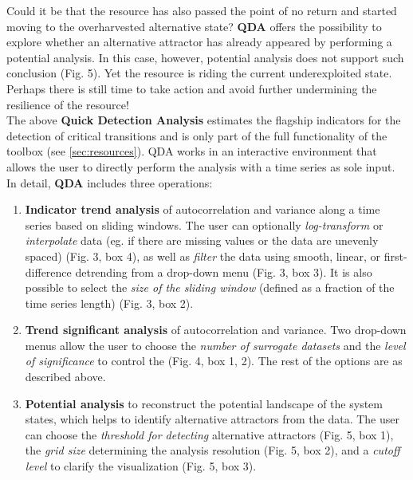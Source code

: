 \documentclass[12pt,a4paper,final]{article}
\begin{document}
\begin{doublespacing}
Could it be that the resource has also passed the point of no return and started moving to the overharvested alternative state? \textbf{QDA} offers the possibility to explore whether an alternative attractor has already appeared by performing a potential analysis. In this case, however, potential analysis does not support such conclusion (Fig. 5). Yet the resource is riding the current underexploited state. Perhaps there is still time to take action and avoid further undermining the resilience of the resource!\\


The above \textbf{Quick Detection Analysis} estimates the flagship indicators for the detection of critical transitions and is only part of the full functionality of the toolbox (see \ref{sec:resources}). QDA works in an interactive environment that allows the user to directly perform the analysis with a time series as sole input.
In detail, \textbf{QDA} includes three operations:
\begin{enumerate}
\item \textbf{Indicator trend analysis} of autocorrelation and variance along a time series based on sliding windows. The user can optionally \textit{log-transform} or \textit{interpolate} data (eg. if there are missing values or the data are unevenly spaced) (Fig. 3, box 4), as well as \textit{filter} the data using smooth, linear, or first-difference detrending from a drop-down menu (Fig. 3, box 3). It is also possible to select the \textit{size of the sliding window} (defined as a fraction of the time series length) (Fig. 3, box 2).
\item \textbf{Trend significant analysis} of autocorrelation and variance. Two drop-down menus allow the user to choose the \textit{number of surrogate datasets} and the \textit{level of significance} to control the  (Fig. 4, box 1, 2). The rest of the options are as described above.
\item \textbf{Potential analysis} to reconstruct the potential landscape of the system states, which helps to identify alternative attractors from the data. The user can choose the \textit{threshold for detecting} alternative attractors (Fig. 5, box 1), the \textit{grid size} determining the analysis resolution (Fig. 5, box 2), and a \textit{cutoff level} to clarify the visualization (Fig. 5, box 3).
\end{enumerate}


\end{doublespacing}
\end{document}
